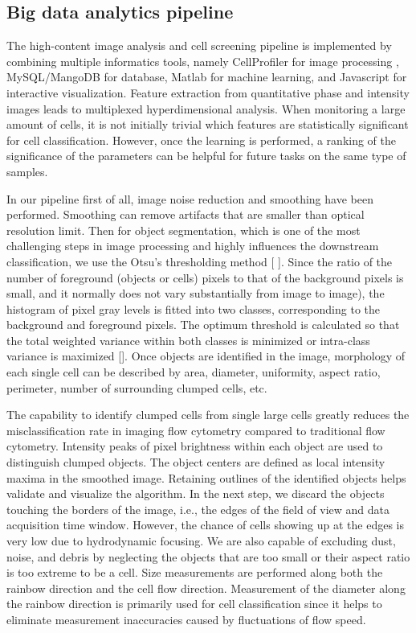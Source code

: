 \documentclass[aps,pra,reprint,superscriptaddress]{revtex4-1}
\begin{document}
\subsection{Big data analytics pipeline}

The high-content image analysis and cell screening pipeline is implemented by combining multiple informatics tools, namely CellProfiler for image processing \cite{carpenter2006cellprofiler,kamentsky2011improved}, MySQL/MangoDB for database, Matlab for machine learning, and Javascript for interactive visualization. 
Feature extraction from quantitative phase and intensity images leads to multiplexed hyperdimensional analysis. When monitoring a large amount of cells, it is not initially trivial which features are statistically significant for cell classification. However, once the learning is performed, a ranking of the significance of the parameters can be helpful for future tasks on the same type of samples. 

In our pipeline first of all, image noise reduction and smoothing have been performed. Smoothing can remove artifacts that are smaller than optical resolution limit. Then for object segmentation, which is one of the most challenging steps in image processing and highly influences the downstream classification, we use the Otsu's thresholding method [ ]. Since the ratio of the number of foreground (objects or cells) pixels to that of the background pixels is small, and it normally does not vary substantially from image to image), the histogram of pixel gray levels is fitted into two classes,  corresponding to the background and foreground pixels. The optimum threshold is calculated so that the total weighted variance within both classes is minimized or intra-class variance is maximized []. Once objects are identified in the image, morphology of each single cell can be described by area, diameter, uniformity, aspect ratio, perimeter, number of surrounding clumped cells, etc.

The capability to identify clumped cells from single large cells greatly reduces the misclassification rate in imaging flow cytometry compared to traditional flow cytometry. Intensity peaks of pixel brightness within each object are used to distinguish clumped objects. The object centers are defined as local intensity maxima in the smoothed image. Retaining outlines of the identified objects helps validate and visualize the algorithm. In the next step, we discard the objects touching the borders of the image, i.e., the edges of the field of view and data acquisition time window. However, the chance of cells showing up at the edges is very low due to hydrodynamic focusing. We are also capable of excluding dust, noise, and debris by neglecting the objects that are too small or their aspect ratio is too extreme to be a cell. Size measurements are performed along both the rainbow direction and the cell flow direction. Measurement of the diameter along the rainbow direction is primarily used for cell classification since it helps to eliminate measurement inaccuracies caused by fluctuations of flow speed. 
\end{document}

